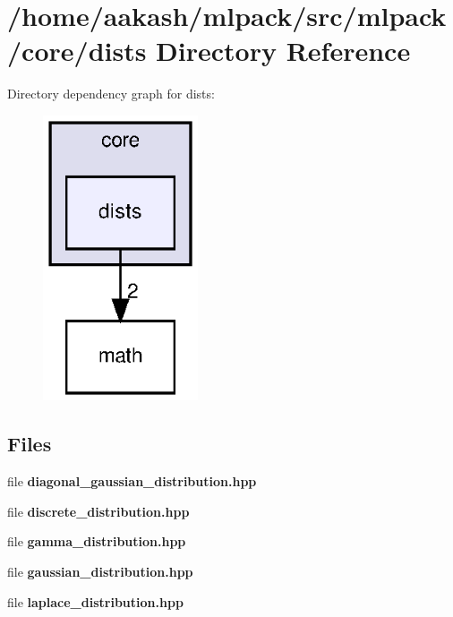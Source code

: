 \section{/home/aakash/mlpack/src/mlpack/core/dists Directory Reference}
\label{dir_1d29dda40ef36f6615cae6f86e87bfd7}
Directory dependency graph for dists\+:
\nopagebreak
\begin{figure}[H]
\begin{center}
\leavevmode
\includegraphics[width=130pt]{dir_1d29dda40ef36f6615cae6f86e87bfd7_dep}
\end{center}
\end{figure}
\subsection*{Files}
\begin{DoxyCompactItemize}
\item 
file \textbf{ diagonal\+\_\+gaussian\+\_\+distribution.\+hpp}
\item 
file \textbf{ discrete\+\_\+distribution.\+hpp}
\item 
file \textbf{ gamma\+\_\+distribution.\+hpp}
\item 
file \textbf{ gaussian\+\_\+distribution.\+hpp}
\item 
file \textbf{ laplace\+\_\+distribution.\+hpp}
\end{DoxyCompactItemize}
